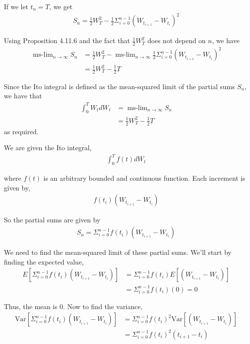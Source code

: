 \documentclass[12pt]{article}
\newenvironment{problem}[2][Problem]{\begin{trivlist}
\item[\hskip \labelsep {\bfseries #1}\hskip \labelsep {\bfseries #2.}]}{\end{trivlist}}
\begin{document}
If we let $t_n = T$, we get
\begin{align*}
S_n = \frac{1}{2}W^2_T - \frac{1}{2} \Sigma_{i=0}^{n-1}(W_{t_{i+1}} - W_{t_i})^2
\end{align*}

Using Proposition 4.11.6 and the fact that $\frac{1}{2}W^2_T$ does not depend on $n$, we have
\begin{align*}
\operatorname{ms-\lim}_{n \to \infty} S_n &= \frac{1}{2}W^2_T - \operatorname{ms-\lim}_{n \to \infty} \frac{1}{2} \Sigma_{i=0}^{n-1}(W_{t_{i+1}} - W_{t_i})^2\\
&= \frac{1}{2}W^2_T - \frac{1}{2}T
\end{align*}

Since the Ito integral is defined as the mean-squared limit of the partial sums $S_n$, we have that
\begin{align*}
\int_0^T W_tdW_t &= \operatorname{ms-\lim}_{n \to \infty} S_n\\
&= \frac{1}{2}W^2_T - \frac{1}{2}T
\end{align*}
as required.

\begin{problem}{14}
\end{problem}

We are given the Ito integral,
\begin{align*}
\int_0^T f(t)dW_t
\end{align*}

where $f(t)$ is an arbitrary bounded and continuous function. Each increment is given by,
\begin{align*}
f(t_i)(W_{t_{i+1}} - W_{t_i})
\end{align*}

So the partial sums are given by
\begin{align*}
S_n = \Sigma_{i=0}^{n-1} f(t_i)(W_{t_{i+1}} - W_{t_i})
\end{align*}

We need to find the mean-squared limit of these partial sums. We'll start by finding the expected value,
\begin{align*}
E[\Sigma_{i=0}^{n-1} f(t_i)(W_{t_{i+1}} - W_{t_i})] &= \Sigma_{i=0}^{n-1} f(t_i)E[(W_{t_{i+1}} - W_{t_i})]\\
&= \Sigma_{i=0}^{n-1} f(t_i)(0) = 0
\end{align*}

Thus, the mean is $0$. Now to find the variance,
\begin{align*}
\text{Var}[\Sigma_{i=0}^{n-1} f(t_i)(W_{t_{i+1}} - W_{t_i})] &= \Sigma_{i=0}^{n-1} f(t_i)^2\text{Var}[(W_{t_{i+1}} - W_{t_i})]\\
&= \Sigma_{i=0}^{n-1} f(t_i)^2(t_{i+1} - t_i)
\end{align*}
\end{document}
